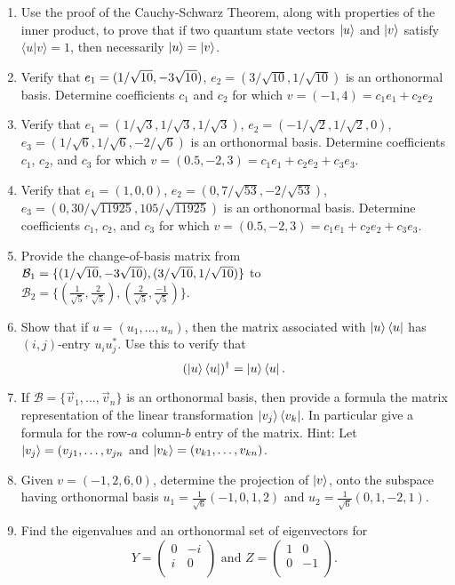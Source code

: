 \documentclass [12pt]{article}
\theoremstyle{definition}
\begin{document}
\begin{enumerate}
\item Use the proof of the Cauchy-Schwarz Theorem, along with properties of the inner product, to prove that if two quantum state vectors $\ket{u}$ and 
$\ket{v}$  satisfy  $\langle u| v\rangle=1$, then necessarily $\ket{u}=\ket{v}$.

\item Verify that  $e_{1}=(1/\sqrt{10},-3\/\sqrt{10})$, $e_{2}=(3/\sqrt{10},1/\sqrt{10})$ is an orthonormal basis. 
Determine coefficients $c_1$ and $c_2$ for which $v=(-1,4)=c_1e_1 + c_2e_2$ 


\item Verify that $e_{1}=(1/\sqrt{3},1/\sqrt{3},1/\sqrt{3})$,  $e_{2}=(-1/\sqrt{2},1/\sqrt{2},0)$,  $e_{3}=(1/\sqrt{6},1/\sqrt{6},-2/\sqrt{6})$ 
is an orthonormal basis. 
Determine coefficients $c_1$, $c_2$, and $c_3$ for which $v=(0.5,-2,3)=c_1e_1 + c_2e_2 + c_3e_3$.

\item Verify that $e_{1}=(1,0,0)$,  $e_{2}=(0,7/\sqrt{53},-2/\sqrt{53})$,  $e_{3}=(0,30/\sqrt{11925},105/\sqrt{11925})$ 
is an orthonormal basis. 
Determine coefficients $c_1$, $c_2$, and $c_3$ for which $v=(0.5,-2,3)=c_1e_1 + c_2e_2 + c_3e_3$.

\item Provide the change-of-basis matrix from $\mathcal{B}_1=\{(1/\sqrt{10},-3\/\sqrt{10}),(3/\sqrt{10},1/\sqrt{10})\}$ to\\
 $\mathcal{B}_2=\{(\frac{1}{\sqrt{5}},\frac{2}{\sqrt{5}}),(\frac{2}{\sqrt{5}},\frac{-1}{\sqrt{5}})\}$.

\item Show that if $u=(u_1,\ldots,u_n)$, then the matrix associated with $\ket{u}\bra{u}$ has $(i,j)$-entry $u_iu_j^*$. Use this to verify that
\[(\ket{u}\bra{u})^{\dagger} = \ket{u}\bra{u}.\]

\item If $\mathcal{B}=\{\vec{v}_1,\ldots,\vec{v}_n\}$ is an orthonormal basis, then provide a formula  the
 matrix representation of the linear transformation
$\ket{v_j}\bra{v_k}$. In particular give a formula for the row-$a$ column-$b$ entry of the matrix.
Hint: Let $\ket{v_j}=(v_{j1},\ldots,v_{jn}$ and  $\ket{v_k}=(v_{k1},\ldots,v_{kn})$.

\item Given $v=(-1,2,6,0)$, determine the projection of $\ket{v}$, onto the subspace having orthonormal basis $u_{1}=\frac{1}{\sqrt{6}}(-1,0,1,2)$ and $u_{2}=\frac{1}{\sqrt{6}}(0,1,-2,1)$.

\item Find the eigenvalues and an orthonormal set of eigenvectors for 
\[
Y=\left(\begin{array}{cc}
0 & -i\\
i & 0\\
\end{array}\right)\mbox{ and }
Z = \left(\begin{array}{cc}
1 & 0 \\
0 & -1 \\
\end{array}\right).\]


\end{enumerate}
\end{document}
